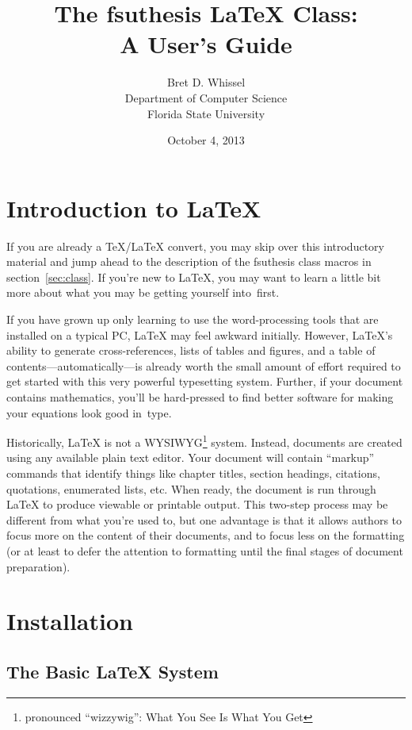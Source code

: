 \documentclass[11pt,letterpaper]{ltxdockit}[2011/03/25]
\title{The \textsf{fsuthesis} \LaTeX{} Class:\\
  A User's Guide}
\author{Bret D. Whissel\\Department of Computer Science\\Florida State University}
\date{October 4, 2013}
\newcommand*{\acro}[1]{{\small\textsc{#1}}}
\newcommand*{\pkg}[1]{\textsf{#1}}
\newcommand*{\fsuth}{\pkg{fsuthesis}}
\renewcommand{\-}{\discretionary{}{}{}}
\begin{document}
\maketitle

\tableofcontents

\section{Introduction to \LaTeX}
\label{sec:intro}

If you are already a \TeX/\LaTeX{} convert, you may skip over this
introductory material and jump ahead to the description of the
\fsuth{} class macros in section~\ref{sec:class}.  If you're new to
\LaTeX, you may want to learn a little bit more about what you may be
getting yourself into~first.

If you have grown up only learning to use the word-processing tools
that are installed on a typical PC, \LaTeX{} may feel awkward
initially.  However, \LaTeX's ability to generate cross-references,
lists of tables and figures, and a table of
contents---automatically---is already worth the small amount of effort
required to get started with this very powerful typesetting system.
Further, if your document contains mathematics, you'll be hard-pressed
to find better software for making your equations look good in~type.

Historically, \LaTeX{} is not a \acro{WYSIWYG}\footnote{pronounced
  ``wizzywig'': What You See Is What You Get} system.  Instead,
documents are created using any available plain text editor.  Your
document will contain ``markup'' commands that identify things like
chapter titles, section headings, citations, quotations, enumerated
lists, etc.  When ready, the document is run through \LaTeX{} to
produce viewable or printable output.  This two-step process may be
different from what you're used to, but one advantage is that it
allows authors to focus more on the content of their documents, and to
focus less on the formatting (or at least to defer the attention to
formatting until the final stages of document preparation).

\section{Installation}%
%
\label{sec:install}

\subsection{The Basic \LaTeX{} System}
\end{document}
